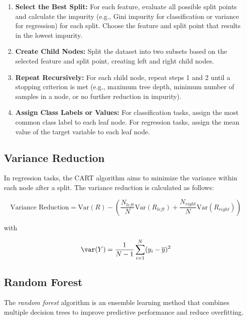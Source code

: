 \begin{enumerate}

    \item \textbf{Select the Best Split:} For each feature, evaluate all possible split points and calculate the impurity (e.g., Gini impurity for classification or variance for regression) 
    for each split. Choose the feature and split point that results in the lowest impurity.

    \item \textbf{Create Child Nodes:} Split the dataset into two subsets based on the selected feature and split point, creating left and right child nodes.

    \item \textbf{Repeat Recursively:} For each child node, repeat steps 1 and 2 until a stopping criterion is met (e.g., maximum tree depth, minimum number of samples in a node, or no further reduction in impurity).

    \item \textbf{Assign Class Labels or Values:} For classification tasks, assign the most common class label to each leaf node. For regression tasks, assign the mean value of the target variable to each leaf node.
    
\end{enumerate}

\subsection{Variance Reduction}

In regression tasks, the CART algorithm aims to minimize the variance within each node after a split. The variance reduction is calculated as follows: 

\[
    \text{Variance Reduction} = \text{Var}(R) - \left( \frac{N_{left}}{N} \text{Var}(R_{left}) + \frac{N_{right}}{N} \text{Var}(R_{right}) \right)
\]

with 

\[
    \var (Y) = \frac{1}{N - 1} \sum_{i = 1}^{N} (y_i - \overline{y})^2
\]

\subsection{Random Forest}

The \emph{random forest} algorithm is an ensemble learning method that combines multiple decision trees to improve predictive performance and reduce overfitting.


